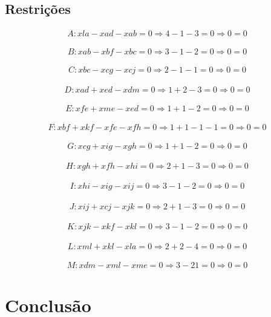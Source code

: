 \documentclass[a4paper]{report}
\begin{document}
\section{Restrições}
\begin{multline}
A: xla - xad - xab = 0
\Rightarrow 4 - 1 - 3 = 0 
\Rightarrow 0 = 0
\end{multline}

\begin{multline}
B: xab - xbf - xbc = 0 
\Rightarrow 3 - 1 - 2 = 0
\Rightarrow 0 = 0
\end{multline}

\begin{multline}
C: xbc - xcg - xcj = 0
\Rightarrow 2 - 1 - 1 = 0
\Rightarrow 0 = 0
\end{multline}

\begin{multline}
D: xad + xed - xdm = 0
\Rightarrow 1 + 2 - 3 = 0
\Rightarrow 0 = 0
\end{multline}

\begin{multline}
E: xfe + xme - xed = 0
\Rightarrow 1 + 1 - 2 = 0
\Rightarrow 0 = 0
\end{multline}

\begin{multline}
F: xbf + xkf - xfe - xfh = 0
\Rightarrow 1 + 1 - 1 - 1 = 0
\Rightarrow 0 = 0
\end{multline}

\begin{multline}
G: xcg + xig - xgh = 0
\Rightarrow 1 + 1 - 2 = 0
\Rightarrow 0 = 0
\end{multline}

\begin{multline}
H: xgh + xfh - xhi = 0
\Rightarrow 2 + 1 - 3 = 0
\Rightarrow 0 = 0
\end{multline}

\begin{multline}
I: xhi - xig - xij = 0
\Rightarrow 3 - 1 - 2 = 0
\Rightarrow 0 = 0
\end{multline}

\begin{multline}
J: xij + xcj - xjk = 0
\Rightarrow 2 + 1 - 3 = 0
\Rightarrow 0 = 0
\end{multline}

\begin{multline}
K: xjk - xkf - xkl = 0
\Rightarrow 3 - 1 - 2 = 0
\Rightarrow 0 = 0
\end{multline}

\begin{multline}
L: xml + xkl - xla = 0
\Rightarrow 2 + 2 - 4 = 0
\Rightarrow 0 = 0
\end{multline}

\begin{multline}
M: xdm - xml - xme = 0
\Rightarrow 3 - 2 1 = 0
\Rightarrow 0 = 0
\end{multline}

\chapter{Conclusão}
\end{document}
